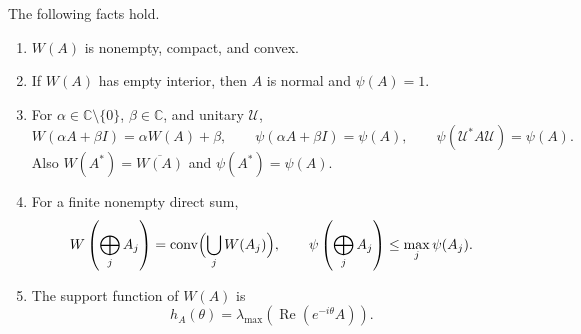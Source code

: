 \documentclass[preprints,article,submit,oneauthor]{Definitions/mdpi}
\numberwithin{equation}{section}
\newcommand{\C}{\mathbb C}
\newcommand{\conv}{\operatorname{conv}}
\newcommand{\Rea}{\operatorname{Re}}
\begin{document}
\begin{Lemma}\label{lem:foundation}
The following facts hold.
\begin{enumerate}
\item \(W(A)\) is nonempty, compact, and convex.
\item If \(W(A)\) has empty interior, then \(A\) is normal and
\(\psi(A)=1\).
\item For \(\alpha\in\C\setminus\{0\}\), \(\beta\in\C\), and unitary
\(\mathcal U\),
\[
 W(\alpha A+\beta I)=\alpha W(A)+\beta,\qquad
 \psi(\alpha A+\beta I)=\psi(A),\qquad
 \psi(\mathcal U^*A\mathcal U)=\psi(A).
\]
Also \(W(A^*)=\overline{W(A)}\) and \(\psi(A^*)=\psi(A)\).
\item For a finite nonempty direct sum,
\[
 W\left(\bigoplus_jA_j\right)=\conv\Bigl(\bigcup_jW(A_j)\Bigr),
 \qquad
 \psi\left(\bigoplus_jA_j\right)\leq\max_j\psi(A_j).
\]
\item The support function of \(W(A)\) is
\[
 h_A(\theta)=\lambda_{\max}\!\left(\Rea(e^{-i\theta}A)\right).
\]
\end{enumerate}
\end{Lemma}
\end{document}
